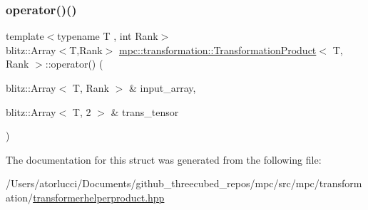 \subsubsection{\texorpdfstring{operator()()}{operator()()}}
{\footnotesize\ttfamily template$<$typename T , int Rank$>$ \\
blitz\+::\+Array$<$T,Rank$>$ \mbox{\hyperlink{structmpc_1_1transformation_1_1_transformation_product}{mpc\+::transformation\+::\+Transformation\+Product}}$<$ T, Rank $>$\+::operator() (\begin{DoxyParamCaption}\item[{blitz\+::\+Array$<$ T, Rank $>$ \&}]{input\+\_\+array,  }\item[{blitz\+::\+Array$<$ T, 2 $>$ \&}]{trans\+\_\+tensor }\end{DoxyParamCaption})}



The documentation for this struct was generated from the following file\+:\begin{DoxyCompactItemize}
\item 
/\+Users/atorlucci/\+Documents/github\+\_\+threecubed\+\_\+repos/mpc/src/mpc/transformation/\mbox{\hyperlink{transformerhelperproduct_8hpp}{transformerhelperproduct.\+hpp}}\end{DoxyCompactItemize}
